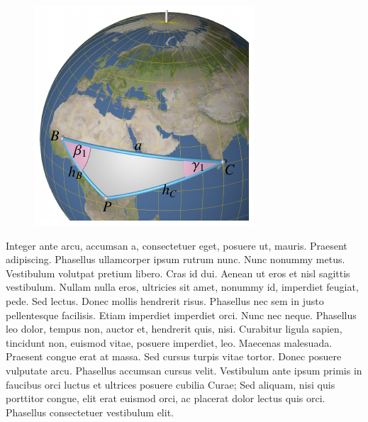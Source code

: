 \documentclass[12pt]{article}
\begin{document}
\begin{figure}
\includegraphics{position3-small.pdf}
\end{figure}
Integer ante arcu, accumsan a, consectetuer eget, posuere ut, mauris.
Praesent adipiscing. Phasellus ullamcorper ipsum rutrum nunc. Nunc
nonummy metus. Vestibulum volutpat pretium libero. Cras id dui.
Aenean ut eros et nisl sagittis vestibulum. Nullam nulla eros,
ultricies sit amet, nonummy id, imperdiet feugiat, pede. Sed lectus.
Donec mollis hendrerit risus. Phasellus nec sem in justo pellentesque
facilisis. Etiam imperdiet imperdiet orci. Nunc nec neque. Phasellus
leo dolor, tempus non, auctor et, hendrerit quis, nisi. Curabitur
ligula sapien, tincidunt non, euismod vitae, posuere imperdiet,
leo. Maecenas malesuada. Praesent congue erat at massa. Sed cursus
turpis vitae tortor. Donec posuere vulputate arcu. Phasellus accumsan
cursus velit. Vestibulum ante ipsum primis in faucibus orci luctus
et ultrices posuere cubilia Curae; Sed aliquam, nisi quis porttitor
congue, elit erat euismod orci, ac placerat dolor lectus quis orci.
Phasellus consectetuer vestibulum elit.
\end{document}

